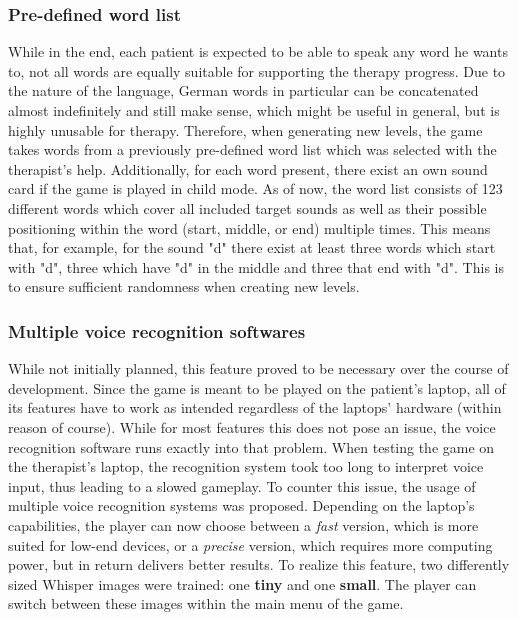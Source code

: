 \documentclass[draft,final]{vutinfth} %
\begin{document}
\subsubsection{Pre-defined word list}
While in the end, each patient is expected to be able to speak any word he wants to, not all words are equally suitable for supporting the therapy progress. Due to the nature of the language, German words in particular can be concatenated almost indefinitely and still make sense, which might be useful in general, but is highly unusable for therapy. Therefore, when generating new levels, the game takes words from a previously pre-defined word list which was selected with the therapist's help. Additionally, for each word present, there exist an own sound card if the game is played in child mode. As of now, the word list consists of 123 different words which cover all included target sounds as well as their possible positioning within the word (start, middle, or end) multiple times. This means that, for example, for the sound "d" there exist at least three words which start with "d", three which have "d"  in the middle and three that end with "d". This is to ensure sufficient randomness when creating new levels.

\subsubsection{Multiple voice recognition softwares}
While not initially planned, this feature proved to be necessary over the course of development. Since the game is meant to be played on the patient's laptop, all of its features have to work as intended regardless of the laptops' hardware (within reason of course). While for most features this does not pose an issue, the voice recognition software runs exactly into that problem. When testing the game on the therapist's laptop, the recognition system took too long to interpret voice input, thus leading to a slowed gameplay. To counter this issue, the usage of multiple voice recognition systems was proposed. Depending on the laptop's capabilities, the player can now choose between a \emph{fast} version, which is more suited for low-end devices, or a \emph{precise} version, which requires more computing power, but in return delivers better results. To realize this feature, two differently sized Whisper images were trained: one \textbf{tiny} and one \textbf{small}. The player can switch between these images within the main menu of the game.
\end{document}
